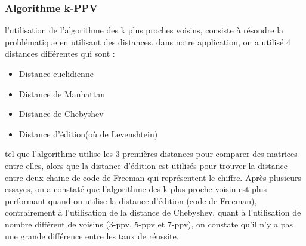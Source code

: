 \documentclass[10pt,a4paper]{report}
\begin{document}
\subsubsection{Algorithme k-PPV}
l'utilisation de l'algorithme des k plus proches voisins, consiste à résoudre la problématique en utilisant des distances.
dans notre application, on a utilisé 4 distances différentes qui sont : 
\begin{itemize}[label=$-$,leftmargin=*,parsep=0cm,itemsep=0cm,topsep=0cm]
\item Distance euclidienne
\item Distance de Manhattan 
\item Distance de Chebyshev
\item Distance d'édition(où de Levenshtein)
\end{itemize}
tel-que l'algorithme utilise les 3 premières distances pour comparer des matrices entre elles, alors que la distance d'édition est utilisés pour trouver la distance entre deux chaine de code de Freeman 
qui représentent le chiffre.
Après plusieurs essayes, on a constaté que l'algorithme des k plus proche voisin est plus performant quand on utilise la distance d'édition (code de Freeman), contrairement à l'utilisation de la distance de Chebyshev.
quant à l'utilisation de nombre différent de voisins (3-ppv, 5-ppv et 7-ppv), on constate qu'il n'y a pas une grande différence entre les taux de réussite.
\end{document}
